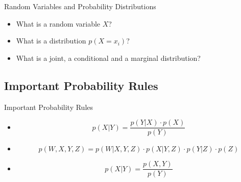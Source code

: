 \begin{frame}{Random Variables and Probability Distributions}{}
	\begin{itemize}
		\item What is a random variable $X$? \\
		\item What is a distribution $p(X = x_i)$? \\
		\item What is a joint, a conditional and a marginal distribution?  \\
	\end{itemize}
\end{frame}


\subsection{Important Probability Rules}

\begin{frame}{Important Probability Rules}{}
	\begin{itemize}
		\item {}
		\begin{equation}
			p(X \vert Y) = \frac{p(Y \vert X) \cdot p(X)}{p(Y)}
		\end{equation}
		\item {}
		\begin{equation}
			p(W, X, Y, Z) = p(W \vert X, Y, Z) \cdot p(X \vert Y, Z) \cdot p(Y \vert Z) \cdot p(Z)
		\end{equation}
		\item {}
		\begin{equation}
			p(X \vert Y) = \frac{p(X, Y)}{p(Y)}
		\end{equation}
	\end{itemize}
\end{frame}


